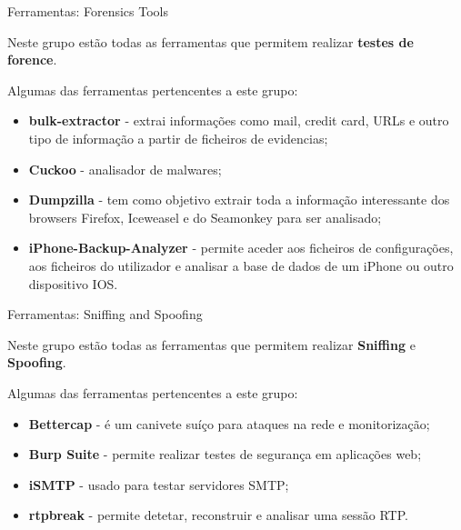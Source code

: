 \documentclass{beamer}
\begin{document}
\begin{frame}{Ferramentas: Forensics Tools}

Neste grupo estão todas as ferramentas que permitem realizar \textbf{testes de forence}.

\hfill

Algumas das ferramentas pertencentes a este grupo:
    \begin{itemize}
        \item \textbf{bulk-extractor} - extrai informações como mail, credit card, URLs e outro tipo de informação a partir de ficheiros de evidencias;
        \item \textbf{Cuckoo} - analisador de malwares;
        \item \textbf{Dumpzilla} - tem como objetivo extrair toda a informação interessante dos browsers Firefox, Iceweasel e do Seamonkey para ser analisado;
        \item \textbf{iPhone-Backup-Analyzer} - permite aceder aos ficheiros de configurações, aos ficheiros do utilizador e analisar a base de dados de um iPhone ou outro dispositivo IOS.
    \end{itemize}
\end{frame}
\begin{frame}{Ferramentas: Sniffing and Spoofing}

Neste grupo estão todas as ferramentas que permitem realizar \textbf{Sniffing} e \textbf{Spoofing}.

\hfill

Algumas das ferramentas pertencentes a este grupo:
    \begin{itemize}
        \item \textbf{Bettercap} - é um canivete suíço para ataques na rede e monitorização;
        \item \textbf{Burp Suite} - permite realizar testes de segurança em aplicações web;
        \item \textbf{iSMTP} - usado para testar servidores SMTP;
        \item \textbf{rtpbreak} - permite detetar, reconstruir e analisar uma sessão RTP.
    \end{itemize}
\end{frame}
\end{document}
